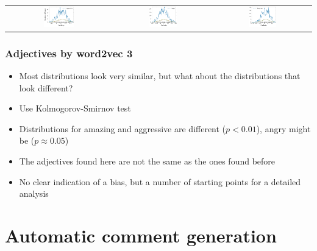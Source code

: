 \documentclass{beamer}
\begin{document}
\begin{frame}
\begin{tabular}{c c c}
\includegraphics[width=0.3\textwidth]{figures/aggressive_distribution.pdf} & \includegraphics[width=0.3\textwidth]{figures/angry_distribution.pdf} & \includegraphics[width=0.3\textwidth]{figures/dangerous_distribution.pdf}
\end{tabular}
\end{frame}

\begin{frame}
\frametitle{Adjectives by word2vec 3}
\begin{itemize}
\item Most distributions look very similar, but what about the distributions that look different?
\item Use Kolmogorov-Smirnov test
\item Distributions for amazing and aggressive are different ($p<0.01$), angry might be ($p\approx0.05$)
\item The adjectives found here are not the same as the ones found before
\item No clear indication of a bias, but a number of starting points for a detailed analysis
\end{itemize}
\end{frame}

\section{Automatic comment generation}
\end{document}
